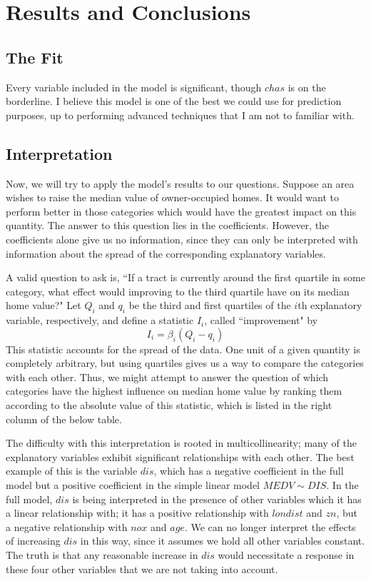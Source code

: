 \documentclass[12pt]{article}
\begin{document}
\section{Results and Conclusions}
\subsection{The Fit}


Every variable included in the model is significant, though $chas$ is on the borderline.  I believe this model is one of the best we could use for prediction purposes, up to performing advanced techniques that I am not to familiar with.

\subsection{Interpretation}
Now, we will try to apply the model's results to our questions.  Suppose an area wishes to raise the median value of owner-occupied homes.  It would want to perform better in those categories which would have the greatest impact on this quantity.  The answer to this question lies in the coefficients.  However, the coefficients alone give us no information, since they can only be interpreted with information about the spread of the corresponding explanatory variables.

A valid question to ask is, ``If a tract is currently around the first quartile in some category, what effect would improving to the third quartile have on its median home value?"  Let $Q_i$ and $q_i$ be the third and first quartiles of the $i$th explanatory variable, respectively, and define a statistic $I_i$, called ``improvement" by
$$
I_i = \beta_i(Q_i - q_i)
$$
This statistic accounts for the spread of the data.  One unit of a given quantity is completely arbitrary, but using quartiles gives us a way to compare the categories with each other.  Thus, we might attempt to answer the question of which categories have the highest influence on median home value by ranking them according to the absolute value of this statistic, which is listed in the right column of the below table.



The difficulty with this interpretation is rooted in multicollinearity; many of the explanatory variables exhibit significant relationships with each other.  The best example of this is the variable $dis$, which has a negative coefficient in the full model but a positive coefficient in the simple linear model $MEDV \sim DIS$.  In the full model, $dis$ is being interpreted in the presence of other variables which it has a linear relationship with; it has a positive relationship with $londist$ and $zn$, but a negative relationship with $nox$ and $age$.  We can no longer interpret the effects of increasing $dis$ in this way, since it assumes we hold all other variables constant.  The truth is that any reasonable increase in $dis$ would necessitate a response in these four other variables that we are not taking into account.
\end{document}
